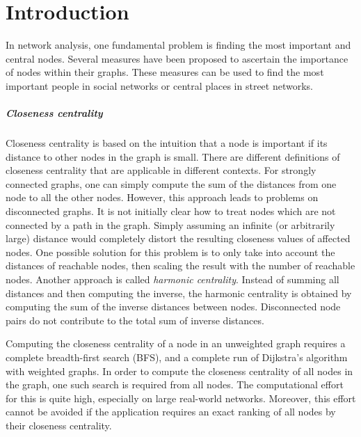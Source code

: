 
\chapter{Introduction}
\label{ch:Introduction}

In network analysis, one fundamental problem is finding the most important and central nodes. Several measures have been proposed to ascertain the importance of nodes within their graphs. These measures can be used to find the most important people in social networks or central places in street networks.

\paragraph{Closeness centrality}

Closeness centrality is based on the intuition that a node is important if its distance to other nodes in the graph is small. There are different definitions of closeness centrality that are applicable in different contexts. For strongly connected graphs, one can simply compute the sum of the distances from one node to all the other nodes. However, this approach leads to problems on disconnected graphs. It is not initially clear how to treat nodes which are not connected by a path in the graph. Simply assuming an infinite (or arbitrarily large) distance would completely distort the resulting closeness values of affected nodes. One possible solution for this problem is to only take into account the distances of reachable nodes, then scaling the result with the number of reachable nodes. Another approach is called \emph{harmonic centrality}. Instead of summing all distances and then computing the inverse, the harmonic centrality is obtained by computing the sum of the inverse distances between nodes. Disconnected node pairs do not contribute to the total sum of inverse distances.

Computing the closeness centrality of a node in an unweighted graph requires a complete breadth-first search (BFS), and a complete run of Dijkstra's algorithm~\cite{dijkstra1959note} with weighted graphs. In order to compute the closeness centrality of all nodes in the graph, one such search is required from all nodes. The computational effort for this is quite high, especially on large real-world networks. Moreover, this effort cannot be avoided if the application requires an exact ranking of all nodes by their closeness centrality.  

